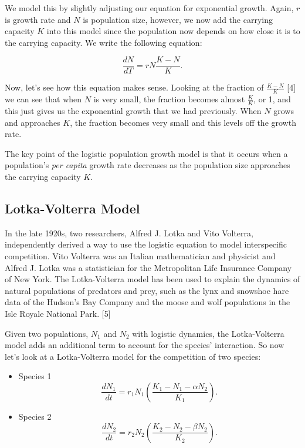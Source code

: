 \documentclass{article}
\begin{document}
We model this by slightly adjusting our equation for exponential growth. Again, $r$ is growth rate and $N$ is population size, however, we now add the carrying capacity $K$ into this model since the population now depends on how close it is to the carrying capacity. We write the following equation:

$$\frac{dN}{dT}=rN\frac{K-N}{K}.$$

Now, let's see how this equation makes sense. Looking at the fraction of $\frac{K-N}{K}$ [4] we can see that when $N$  is very small, the fraction becomes almost $\frac{K}{K}$, or 1, and this just gives us the exponential growth that we had previously. When $N$ grows and approaches $K$, the fraction becomes very small and this levels off the growth rate.

The key point of the logistic population growth model is that it occurs when a population's \emph{per capita} growth rate decreases as the population size approaches the carrying capacity $K$.




\subsection{\textbf{Lotka-Volterra Model}}

In the late 1920s, two researchers, Alfred J. Lotka and Vito Volterra, independently derived a way to use the logistic equation to model interspecific competition. Vito Volterra was an Italian mathematician and physicist and Alfred J. Lotka was a statistician for the Metropolitan Life Insurance Company of New York. The Lotka-Volterra model has been used to explain the dynamics of natural populations of predators and prey, such as the lynx and snowshoe hare data of the Hudson's Bay Company and the moose and wolf populations in the Isle Royale National Park. [5]

Given two populations, $N_{1}$ and $N_{2}$ with logistic dynamics, the Lotka-Volterra model adds an additional term to account for the species' interaction. So now let's look at a Lotka-Volterra model for the competition of two species:

\begin{itemize}
\item  Species 1
$$\frac{dN_{1}}{dt}=r_{1}N_{1}\left(\frac{K_{1}-N_{1}-\alpha N_{2}}{K_{1}}\right).$$

\item Species 2
$$\frac{dN_{2}}{dt}=r_{2}N_{2}\left(\frac{K_{2}-N_{2}-\beta N_{2}}{K_{2}}\right).$$
\end{itemize}
\end{document}
